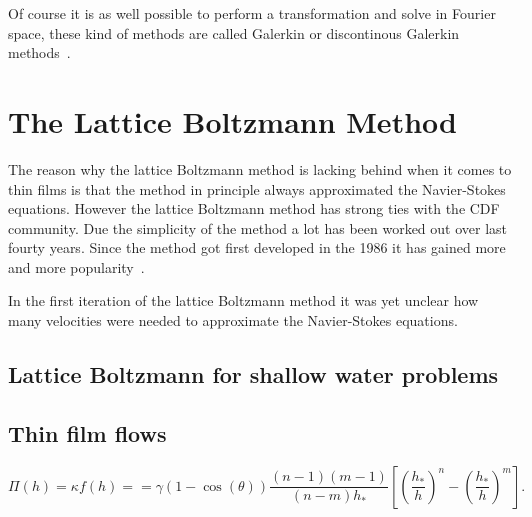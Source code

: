 Of course it is as well possible to perform a transformation and solve in Fourier space, these kind of methods are called Galerkin or discontinous Galerkin methods~\cite{ern2013theory}. 

\section{The Lattice Boltzmann Method}\label{sec:LBM}


The reason why the lattice Boltzmann method is lacking behind when it comes to thin films is that the method in principle always approximated the Navier-Stokes equations.
However the lattice Boltzmann method has strong ties with the CDF community.
Due the simplicity of the method a lot has been worked out over last fourty years.
Since the method got first developed in the 1986 it has gained more and more popularity~\cite{PhysRevLett.56.1505}.

In the first iteration of the lattice Boltzmann method it was yet unclear how many velocities were needed to approximate the Navier-Stokes equations.


\subsection{Lattice Boltzmann for shallow water problems}


\subsection{Thin film flows}
\begin{equation}\label{eq:disjoining_pressure}
    \Pi(h) = \kappa f(h) = = \gamma(1-\cos(\theta))\frac{(n-1)(m-1)}{(n-m)h_{\ast}}\left[\left(\frac{h_{\ast}}{h}\right)^n-\left(\frac{h_{\ast}}{h}\right)^m\right].
\end{equation}